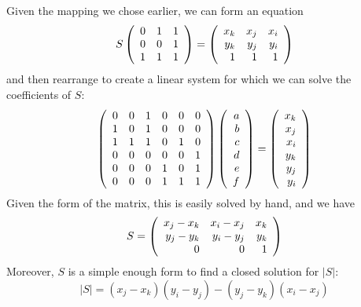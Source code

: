 Given the mapping we chose earlier, we can form an equation
\begin{equation}
S \left(\begin{array}{rrrrrr}  0 & 1 & 1 \\ 0 & 0 & 1 \\ 1 & 1 & 1  \\ \end{array} \right)
= \left(\begin{array}{rrrrrr}  x_k & x_j & x_i \\ y_k & y_j & y_i \\ 1 & 1 & 1 \\ \end{array} \right)
\end{equation}
and then rearrange to create a linear system for which we can solve the coefficients of $S$:
\begin{equation}
\left(\begin{array}{rrrrrr} 
    0 & 0 & 1 & 0 & 0 & 0 \\
    1 & 0 & 1 & 0 & 0 & 0 \\
    1 & 1 & 1 & 0 & 1 & 0 \\
    0 & 0 & 0 & 0 & 0 & 1 \\
    0 & 0 & 0 & 1 & 0 & 1 \\
    0 & 0 & 0 & 1 & 1 & 1 
 \\ \end{array} \right)
\left(\begin{array}{rrrrrr} a \\ b \\ c \\ d \\ e \\ f \\ \end{array} \right)
=
\left(\begin{array}{rrrrrr} x_k \\ x_j \\ x_i \\ y_k \\ y_j \\ y_i  \\ \end{array} \right)
\end{equation}
Given the form of the matrix, this is easily solved by hand, and we have
\begin{equation}
S = \left(\begin{array}{rrrrrr} 
    x_j - x_k & x_i - x_j & x_k \\
    y_j - y_k & y_i - y_j & y_k \\
    0 & 0 & 1
 \\ \end{array} \right)
\end{equation}
Moreover, $S$ is a simple enough form to find a closed solution for $|S|$:
\begin{equation}
|S| = 
(x_j - x_k)(y_i - y_j) -
(y_j - y_k)(x_i - x_j)
\end{equation}


